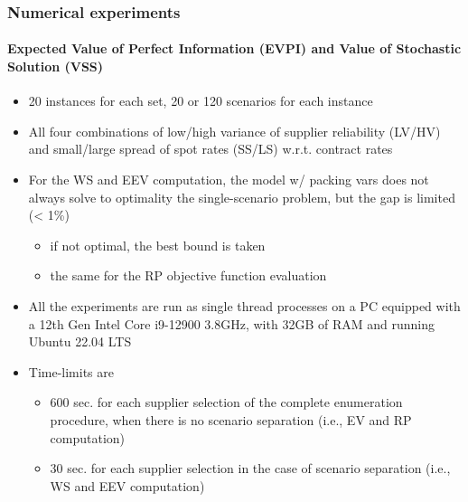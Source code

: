 \documentclass[9pt,xcolor={dvipsnames}]{beamer}
\begin{document}
\begin{frame}%
	\frametitle{Numerical experiments}
	\framesubtitle{Expected Value of Perfect Information (EVPI) and Value of Stochastic Solution (VSS)}
	\begin{itemize}
		\small
		\item<1-> 20 instances for each set, 20 or 120 scenarios for each instance
		\bigskip
		\item<2-> All four combinations of low/high variance of supplier reliability (LV/HV) and small/large spread of spot rates (SS/LS) w.r.t. contract rates
		\bigskip
		\item<3-> For the WS and EEV computation, the model w/ packing vars does not always solve to optimality the single-scenario problem, but the gap is limited (< 1\%)
		\begin{itemize}
			\item<3-> if not optimal, the best bound is taken
			\item<4-> the same for the RP objective function evaluation
		\end{itemize}
		\bigskip
		\item<5-> All the experiments are run as single thread processes on a PC equipped with a 12th Gen Intel Core i9-12900 3.8GHz, with 32GB of RAM and running Ubuntu 22.04 LTS
		\bigskip
		\item<6-> Time-limits are
		\begin{itemize}
			\item<6-> 600 sec. for each supplier selection of the complete enumeration procedure, when there is no scenario separation (i.e., EV and RP computation)
			\item<7->  30 sec. for each supplier selection in the case of scenario separation (i.e., WS and EEV computation)
		\end{itemize}
	\end{itemize}
\end{frame}
\end{document}
